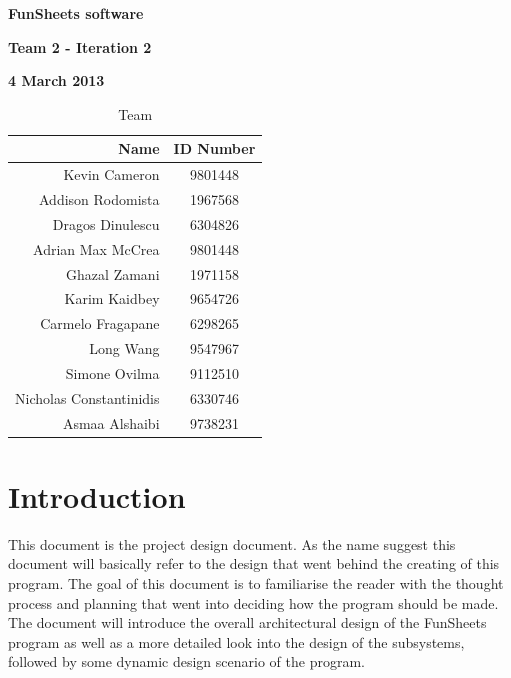 \documentclass[12pt]{article}
\begin{document}
\vspace*{0.5in}
\centerline{\bf\Large FunSheets software}

\vspace*{0.5in}
\centerline{\bf\Large Team 2 - Iteration 2}

\vspace*{0.5in}
\centerline{\bf\Large 4 March 2013}

\vspace*{1.5in}
\begin{table}[htbp]
\caption{Team}
\begin{center}
\begin{tabular}{|r | c|}
\hline
Name & ID Number \\\hline\hline
Kevin Cameron & 9801448 \\\hline\hline
Addison Rodomista & 1967568 \\\hline\hline
Dragos Dinulescu & 6304826 \\\hline\hline
Adrian Max McCrea & 9801448 \\\hline\hline
Ghazal Zamani & 1971158 \\\hline\hline
Karim Kaidbey & 9654726 \\\hline\hline
Carmelo Fragapane & 6298265 \\\hline\hline
Long Wang & 9547967 \\\hline\hline
Simone Ovilma & 9112510 \\\hline\hline
Nicholas Constantinidis & 6330746 \\\hline\hline
Asmaa Alshaibi & 9738231 \\\hline
\end{tabular}
\end{center}
\end{table}

\clearpage

\section{Introduction}
This document is the project design document. As the name suggest this document will basically refer to the design that went behind the creating of this program. The goal of this document is to familiarise the reader with the thought process and planning that went into deciding how the program should be made. The document will introduce the overall architectural design of the FunSheets program as well as a more detailed look into the design of the subsystems, followed by some dynamic design scenario of the program.
\end{document}
